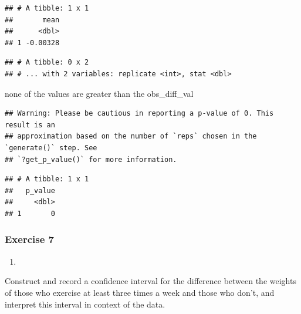 \documentclass[
]{article}
\newenvironment{Shaded}{\begin{snugshade}}{\end{snugshade}}
\newcommand{\DataTypeTok}[1]{\textcolor[rgb]{0.13,0.29,0.53}{#1}}
\newcommand{\KeywordTok}[1]{\textcolor[rgb]{0.13,0.29,0.53}{\textbf{#1}}}
\newcommand{\NormalTok}[1]{#1}
\newcommand{\OperatorTok}[1]{\textcolor[rgb]{0.81,0.36,0.00}{\textbf{#1}}}
\newcommand{\StringTok}[1]{\textcolor[rgb]{0.31,0.60,0.02}{#1}}
\begin{document}
\begin{verbatim}
## # A tibble: 1 x 1
##       mean
##      <dbl>
## 1 -0.00328
\end{verbatim}

\begin{Shaded}
\end{Shaded}

\begin{verbatim}
## # A tibble: 0 x 2
## # ... with 2 variables: replicate <int>, stat <dbl>
\end{verbatim}

none of the values are greater than the obs\_diff\_val

\begin{Shaded}
\end{Shaded}

\begin{verbatim}
## Warning: Please be cautious in reporting a p-value of 0. This result is an
## approximation based on the number of `reps` chosen in the `generate()` step. See
## `?get_p_value()` for more information.
\end{verbatim}

\begin{verbatim}
## # A tibble: 1 x 1
##   p_value
##     <dbl>
## 1       0
\end{verbatim}

\hypertarget{exercise-7}{%
\subsubsection{Exercise 7}\label{exercise-7}}

\begin{enumerate}
\def\labelenumi{\arabic{enumi}.}
\item
\end{enumerate}

Construct and record a confidence interval for the difference between
the weights of those who exercise at least three times a week and those
who don't, and interpret this interval in context of the data.
\end{document}
